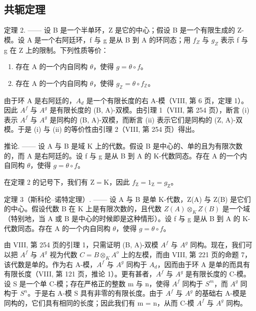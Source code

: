 \subsection{共轭定理}

定理 2. —— 设 B 是一个半单环，Z 是它的中心；假设 B 是一个有限生成的 Z-模。设 A 是一个右阿廷环，f 与 g 是从 B 到 A 的环同态；用 \(f_{Z}\) 与 \(g_{Z}\) 表示 f 与 g 在 Z 上的限制。下列性质等价：

\begin{enumerate}
\def\labelenumi{(\roman{enumi})}
\item
  存在 A 的一个内自同构 \(\theta\)，使得 \(g = \theta \circ f\)。
\item
  存在 A 的一个内自同构 \(\theta\)，使得 \(g_{\mathbb{Z}} = \theta \circ f_{\mathbb{Z}}\)。
\end{enumerate}

由于环 A 是右阿廷的，\(A_{d}\) 是一个有限长度的右 A-模（VIII, 第 6 页，定理 1）。因此 \(A^{f}\) 与 \(A^{g}\) 是有限长度的 (B, A)-双模。由引理 1（VIII, 第 254 页），断言 (i) 表示 \(A^{f}\) 与 \(A^{g}\) 是同构的 (B, A)-双模，而断言 (ii) 表示它们是同构的 (Z, A)-双模。于是 (i) 与 (ii) 的等价性由引理 2（VIII, 第 254 页）得出。

推论. —— 设 A 与 B 是域 K 上的代数。假设 B 是中心的、单的且为有限次数的，而 A 是右阿廷的。设 f 与 g 是从 B 到 A 的 K-代数同态。存在 A 的一个内自同构 \(\theta\)，使得 \(g = \theta \circ f\)。

在定理 2 的记号下，我们有 \(\mathrm{Z} = \mathrm{K}\)，因此 \(f_{\mathrm{Z}} = 1_{\mathrm{Z}} = g_{\mathrm{Z}}\)。

定理 3（斯科伦–诺特定理）. —— 设 A 与 B 是单 K-代数，Z(A) 与 Z(B) 是它们的中心。假设代数 B 在 K 上是有限次数的，且代数 \(Z(A) \otimes_{K} Z(B)\) 是一个域（特别地，当 A 或 B 是中心的时候即是这种情形）。设 f 与 g 是从 B 到 A 的 K-代数同态。存在 A 的一个内自同构 \(\theta\)，使得 \(g = \theta \circ f\)。

由 VIII, 第 254 页的引理 1，只需证明 (B, A)-双模 \(A^{f}\) 与 \(A^{g}\) 同构。现在，我们可以把 \(A^{f}\) 与 \(A^{g}\) 视为代数 \(C = B \otimes_{K} A^{o}\) 上的左模，而由 VIII, 第 221 页的命题 7，该代数是单的。作为右 A-模，\(A^{f}\) 与 \(A^{g}\) 同构于 \(A_{d}\)，因而由于环 A 是单的而具有有限长度（VIII, 第 121 页，推论 1）。更有甚者，\(A^{f}\) 与 \(A^{g}\) 是有限长度的 C-模。设 S 是一个单 C-模；存在严格正的整数 m 与 n，使得 \(A^{f}\) 同构于 \(S^{m}\)，而 \(A^{g}\) 同构于 \(S^{n}\)。于是右 A-模 S 具有非零的有限长度。由于 \(A^{f}\) 与 \(A^{g}\) 的基础右 A-模是同构的，它们具有相同的长度；因此我们有 m = n，从而 C-模 \(A^{f}\) 与 \(A^{g}\) 同构。

